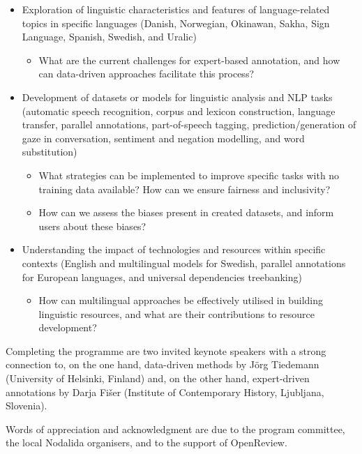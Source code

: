 \begin{itemize}
    \item Exploration of linguistic characteristics and features of language-related topics in specific languages (Danish, Norwegian, Okinawan, Sakha, Sign Language, Spanish, Swedish, and Uralic)
    \begin{itemize}
        \item What are the current challenges for expert-based annotation, and how can data-driven approaches facilitate this process?
    \end{itemize}
    \item Development of datasets or models for linguistic analysis and NLP tasks (automatic speech recognition, corpus and lexicon construction, language transfer, parallel annotations, part-of-speech tagging, prediction/generation of gaze in conversation, sentiment and negation modelling, and word substitution)
    \begin{itemize}
        \item What strategies can be implemented to improve specific tasks with no training data available? How can we ensure fairness and inclusivity?
        \item How can we assess the biases present in created datasets, and inform users about these biases?
    \end{itemize}
    \item Understanding the impact of technologies and resources within specific contexts (English and multilingual models for Swedish, parallel annotations for European languages, and universal dependencies treebanking) 
    \begin{itemize}
        \item How can multilingual approaches be effectively utilised in building linguistic resources, and what are their contributions to resource development?
    \end{itemize}    
\end{itemize}

Completing the programme are two invited keynote speakers with a strong connection to, on the one hand, data-driven methods by Jörg Tiedemann (University of Helsinki, Finland) and, on the other hand, expert-driven annotations by Darja Fišer (Institute of Contemporary History, Ljubljana, Slovenia).  

Words of appreciation and acknowledgment are due to the program committee, the local Nodalida organisers, and to the support of OpenReview. 

